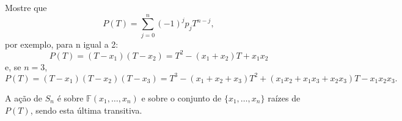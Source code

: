 \documentclass[../algebraIII_notes.tex]{subfiles}
\begin{document}
\begin{exr}
	Mostre que
	\[
		P(T) = \sum\limits_{j=0}^{n}(-1)^{j}p_{j}T^{n-j},
	\]
	por exemplo, para n igual a 2:
	\[
		P(T) = (T-x_1)(T-x_2) = T^{2}-(x_1+x_2)T + x_1x_2
	\]
	e, se \(n=3\),
	\[
		P(T) = (T-x_1)(T-x_2)(T-x_3) = T^{3}-(x_1+x_2+x_3)T^{2}+(x_1x_2+x_1x_3+x_2x_3)T - x_1x_2x_3.
	\]
\end{exr}
\begin{tcolorbox}[
		skin=enhanced,
		title=Observação,
		fonttitle=\bfseries,
		colframe=black,
		colbacktitle=cyan!75!white,
		colback=cyan!15,
		colbacklower=black,
		coltitle=black,
		drop fuzzy shadow,
	]
	A ação de \(S_{n}\) é sobre \(\mathbb{F}(x_1, \dotsc , x_{n})\) e sobre o conjunto de \(\{x_1, \dotsc , x_{n}\}\) raízes de \(P(T)\), sendo esta última transitiva.
\end{tcolorbox}
\end{document}
